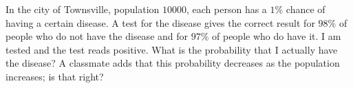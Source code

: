 In the city of Townsville, population $10000$, each person has a $1\%$ chance of having a certain disease. A test for the disease gives the correct result for $98\%$ of people who do not have the disease and for $97\%$ of people who do have it. I am tested and the test reads positive. What is the probability that I actually have the disease? A classmate adds that this probability decreases as the population increases; is that right?
